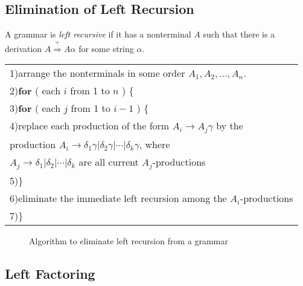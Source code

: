 \documentclass[12pt,a4paper,twoside,openany]{book}
\begin{document}
\subsection{Elimination of Left Recursion}

A grammar is \textit{left recursive} if it has a nonterminal $A$ such that there is a derivation $A\overset{+}{\Rightarrow}A\alpha$ for some string $\alpha$.


\begin{center}
    \begin{tabular}{l}
        1)\qquad arrange the nonterminals in some order $A_1,A_2,\ldots,A_n$.\\
        2)\qquad \textbf{for} ( each $i$ from 1 to $n$ ) \{\\
        3)\qquad\qquad \textbf{for} ( each $j$ from 1 to $i-1$ ) \{\\
        4)\qquad\qquad\qquad replace each production of the form $A_i\rightarrow A_j\gamma$ by the\\
        \qquad\qquad\qquad\qquad production $A_i\rightarrow\delta_1\gamma|\delta_2\gamma|\cdots|\delta_k\gamma$, where\\
        \qquad\qquad\qquad\qquad $A_j\rightarrow\delta_1|\delta_2|\cdots|\delta_k$ are all current $A_j$-productions\\
        5)\qquad\qquad\}\\
        6)\qquad\qquad eliminate the immediate left recursion among the $A_i$-productions\\
        7)\qquad\}
    \end{tabular}
\end{center}
\begin{figure}[htbp]
    \caption{Algorithm to eliminate left recursion from a grammar}
    \label{Figure:4.11}
\end{figure}

\subsection{Left Factoring}
\end{document}
